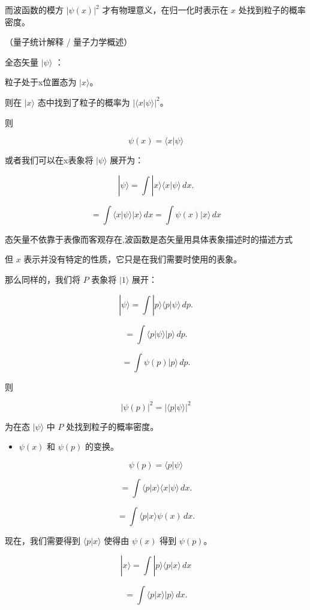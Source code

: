 \documentclass[lang=cn,10pt]{elegantbook}
\begin{document}
而波函数的模方 $|\psi(x)|^2$ 才有物理意义，在归一化时表示在 $x$ 处找到粒子的概率密度。

（量子统计解释 / 量子力学概述）

全态矢量 $| \psi \rangle$ ：

粒子处于x位置态为 $| x \rangle$。

则在 $| x \rangle$ 态中找到了粒子的概率为 $|\langle x | \psi \rangle|^2$。

则 

\[
\psi(x) = \langle x | \psi \rangle
\]

或者我们可以在x表象将 $| \psi \rangle$ 展开为：

\[
| \psi \rangle = \int | x \rangle \langle x | \psi \rangle \, dx.
\]

\[
= \int \langle x | \psi \rangle | x \rangle \, dx=\int  \psi(x)  | x \rangle \, dx
\]

态矢量不依靠于表像而客观存在,波函数是态矢量用具体表象描述时的描述方式

但 $x$ 表示并没有特定的性质，它只是在我们需要时使用的表象。

那么同样的，我们将 $P$ 表象将 $| 1 \rangle$ 展开：

\[
| \psi \rangle = \int | p \rangle \langle p | \psi \rangle \, dp.
\]

\[
= \int \langle p | \psi \rangle | p \rangle \, dp.
\]

\[
= \int \psi(p) | p \rangle \, dp.
\]

则 

\[
|\psi(p)|^2 = |\langle p | \psi \rangle|^2
\]

为在态 $| \psi \rangle$ 中 $P$ 处找到粒子的概率密度。

\begin{itemize}
	\item $\psi(x)$ 和 $\psi(p)$ 的变换。
\end{itemize}

\[
\psi(p) = \langle p | \psi \rangle
\]

\[
= \int \langle p | x \rangle \langle x | \psi \rangle \, dx.
\]

\[
= \int \langle p | x \rangle \psi(x) \, dx.
\]

现在，我们需要得到 $\langle p | x \rangle$ 使得由 $\psi(x)$ 得到 $\psi(p)$。

\[
| x \rangle = \int | p \rangle \langle p | x \rangle \, dx
\]

\[
= \int \langle p | x \rangle | p \rangle \, dx.
\]

\end{document}

